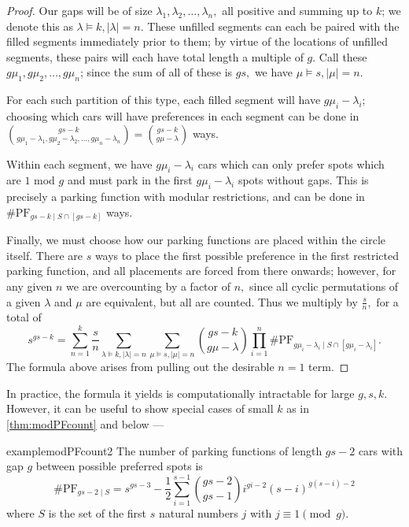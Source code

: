 \documentclass[12 pt]{amsart}
\theoremstyle{definition} %
\theoremstyle{remark} %
\begin{document}
\begin{proof}
    Our gaps will be of size $\lambda_1,\lambda_2,\ldots,\lambda_n,$ all positive and summing up to $k$; we denote this as $\lambda\vDash k,|\lambda|=n.$ These unfilled segments can each be paired with the filled segments immediately prior to them; by virtue of the locations of unfilled segments, these pairs will each have total length a multiple of $g.$ Call these $g\mu_1,g\mu_2,\ldots,g\mu_n$; since the sum of all of these is $gs,$ we have $\mu\vDash s,|\mu|=n.$

    For each such partition of this type, each filled segment will have $g\mu_i-\lambda_i$; choosing which cars will have preferences in each segment can be done in $\binom{gs - k}{g \mu_1 - \lambda_1,g \mu_2 - \lambda_2,\ldots,g \mu_n - \lambda_n}=\binom{gs - k}{g \mu - \lambda}$ ways.
    
    Within each segment, we have $g\mu_i-\lambda_i$ cars which can only prefer spots which are $1$ mod $g$ and must park in the first $g\mu_i-\lambda_i$ spots without gaps. This is precisely a parking function with modular restrictions, and can be done in $\# \mathrm{PF}_{gs - k \mid S \cap [gs - k]}$ ways.

    Finally, we must choose how our parking functions are placed within the circle itself. There are $s$ ways to place the first possible preference in the first restricted parking function, and all placements are forced from there onwards; however, for any given $n$ we are overcounting by a factor of $n,$ since all cyclic permutations of a given $\lambda$ and $\mu$ are equivalent, but all are counted. Thus we multiply by $\frac{s}{n},$ for a total of 
    \[
	    s^{gs - k} = \sum_{n = 1}^{k} \frac{s}{n} \sum_{\lambda \vDash k, \lvert \lambda \rvert = n} \sum_{\mu \vDash s, \lvert \mu \rvert = n} \binom{gs - k}{g \mu - \lambda} \prod_{i = 1}^{n} \# \mathrm{PF}_{g \mu_{i} - \lambda_{i} \mid S \cap [g \mu_{i} - \lambda_{i}]}.
    \]
    The formula above arises from pulling out the desirable $n = 1$ term.
\end{proof}

In practice, the formula it yields is computationally intractable for large $g, s, k$. However, it can be useful to show special cases of small $k$ as in \cref{thm:modPFcount} and below ---

\begin{restatable}{example}{modPFcount2}
	The number of parking functions of length $gs - 2$ cars with gap $g$ between possible preferred spots is
	\[
		\#\mathrm{PF}_{gs - 2 \mid S} = s^{gs - 3} - \frac{1}{2} \sum_{i = 1}^{s - 1} \binom{gs - 2}{gs - 1} i^{gi - 2} (s - i)^{g(s - i) - 2}
	\]
	where $S$ is the set of the first $s$ natural numbers $j$ with $j \equiv 1 \pmod g$.
\end{restatable}
\end{document}
